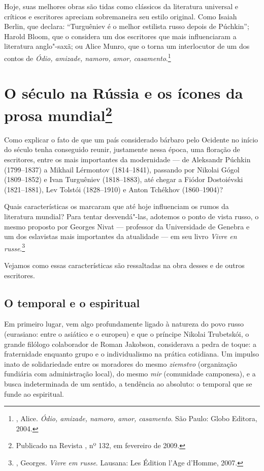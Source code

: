 Hoje, suas melhores obras são tidas como clássicos da literatura universal e críticos e escritores apreciam sobremaneira seu estilo original. Como Isaiah Berlin, que declara: ``Turguêniev é o melhor estilista russo depois de Púchkin''; Harold Bloom, que o considera um dos escritores que mais influenciaram a literatura anglo"-saxã; ou Alice Munro, que o torna um interlocutor de um dos contos de \emph{Ódio, amizade, namoro, amor, casamento}.\footnote{, Alice. \emph{Ódio, amizade, namoro, amor, casamento}. São Paulo: Globo Editora, 2004.}

\chapter{O século {} na Rússia e os ícones da prosa mundial\footnote{Publicado na Revista {}, nº 132, em fevereiro de 2009.}}

Como explicar o fato de que um país considerado bárbaro pelo Ocidente no
início do século  tenha conseguido reunir, justamente nessa época,
uma floração de escritores, entre os mais importantes da modernidade ---
de Aleksandr Púchkin (1799--1837) a Mikhail Lérmontov (1814--1841),
passando por Nikolai Gógol (1809--1852) e Ivan Turguêniev (1818--1883),
até chegar a Fiódor Dostoiévski (1821--1881), Lev Tolstói (1828--1910) e
Anton Tchékhov (1860--1904)?

Quais características os marcaram que até hoje influenciam os rumos da literatura mundial? Para tentar desvendá"-las, adotemos o ponto de vista russo, o mesmo proposto por Georges Nivat --- professor da Universidade de Genebra e um dos eslavistas mais importantes da atualidade --- em seu livro \emph{Vivre en russe}.\footnote{, Georges. \emph{Vivre em russe}. Lausana: Les Édition l'Age d'Homme, 2007.}

Vejamos como essas características são ressaltadas na obra desses e de
outros escritores.

\section{\uppercase{O} temporal e o espiritual}

Em primeiro lugar, vem algo profundamente ligado à natureza do povo
russo (eurasiano: entre o asiático e o europeu) e que o príncipe Nikolai
Trubetskói, o grande filólogo colaborador de Roman Jakobson, considerava
a pedra de toque: a fraternidade enquanto grupo e o individualismo na
prática cotidiana. Um impulso inato de solidariedade entre os moradores
do mesmo \emph{ziemstvo} (organização fundiária com administração
local), do mesmo \emph{mir} (comunidade camponesa), e a busca indeterminada de um sentido, a tendência ao absoluto: o temporal que se funde ao espiritual.

